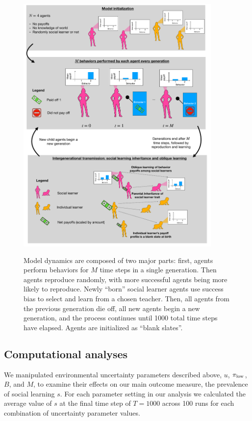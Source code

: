 \documentclass[letterpaper,11.5pt]{scrartcl}
\begin{document}
\begin{figure}
  \caption{Model dynamics are composed of two major parts: first, agents perform
  behaviors for $M$ time steps in a single generation. Then agents reproduce
  randomly, with more successful agents being more likely to reproduce. Newly
  ``born'' social learner agents use success bias to select and learn from a chosen
  teacher. Then, all agents from the previous generation die off, all new agents
  begin a new generation, and the process continues until 1000 total time steps
  have elapsed. Agents are initialized as ``blank slates''.}
  \centering
    \includegraphics[width=0.9\textwidth]{Figures/IntraInterGenerationalDynamics.pdf}
  \label{fig:IntraInterGenerationalDynamics}
\end{figure}



\subsection{Computational analyses}

We manipulated environmental uncertainty parameters described above, $u$,
$\pi_{\mathrm{low}}$, $B$, and $M$, to examine their effects on our
main outcome measure, the prevalence of social learning $s$. For each parameter setting
in our analysis we calculated the average value of $s$ at the final time step
of $T=1000$ across 100 runs for each combination of uncertainty parameter values.
\end{document}
